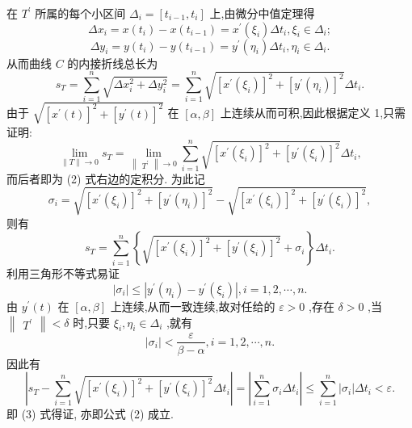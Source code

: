 在 \({T}^{\prime }\) 所属的每个小区间 \({\Delta }_{i} = \left\lbrack  {{t}_{i - 1},{t}_{i}}\right\rbrack\) 上,由微分中值定理得
\[
\Delta {x}_{i} = x\left( {t}_{i}\right)  - x\left( {t}_{i - 1}\right)  = {x}^{\prime }\left( {\xi }_{i}\right) \Delta {t}_{i},{\xi }_{i} \in  {\Delta }_{i};
\]
\[
\Delta {y}_{i} = y\left( {t}_{i}\right)  - y\left( {t}_{i - 1}\right)  = {y}^{\prime }\left( {\eta }_{i}\right) \Delta {t}_{i},{\eta }_{i} \in  {\Delta }_{i}.
\]
从而曲线 \(C\) 的内接折线总长为
\[
{s}_{T} = \mathop{\sum }\limits_{{i = 1}}^{n}\sqrt{\Delta {x}_{i}^{2} + \Delta {y}_{i}^{2}} = \mathop{\sum }\limits_{{i = 1}}^{n}\sqrt{{\left\lbrack  {x}^{\prime }\left( {\xi }_{i}\right) \right\rbrack  }^{2} + {\left\lbrack  {y}^{\prime }\left( {\eta }_{i}\right) \right\rbrack  }^{2}}\Delta {t}_{i}.
\]
由于 \(\sqrt{{\left\lbrack  {x}^{\prime }\left( t\right) \right\rbrack  }^{2} + {\left\lbrack  {y}^{\prime }\left( t\right) \right\rbrack  }^{2}}\) 在 \(\left\lbrack  {\alpha ,\beta }\right\rbrack\) 上连续从而可积,因此根据定义 1,只需证明:
\[
\mathop{\lim }\limits_{{\parallel T\parallel  \rightarrow  0}}{s}_{T} = \mathop{\lim }\limits_{{\begin{Vmatrix}{T}^{\prime }\end{Vmatrix} \rightarrow  0}}\mathop{\sum }\limits_{{i = 1}}^{n}\sqrt{{\left\lbrack  {x}^{\prime }\left( {\xi }_{i}\right) \right\rbrack  }^{2} + {\left\lbrack  {y}^{\prime }\left( {\xi }_{i}\right) \right\rbrack  }^{2}}\Delta {t}_{i}, \tag{3}
\]
而后者即为 (2) 式右边的定积分. 为此记
\[
{\sigma }_{i} = \sqrt{{\left\lbrack  {x}^{\prime }\left( {\xi }_{i}\right) \right\rbrack  }^{2} + {\left\lbrack  {y}^{\prime }\left( {\eta }_{i}\right) \right\rbrack  }^{2}} - \sqrt{{\left\lbrack  {x}^{\prime }\left( {\xi }_{i}\right) \right\rbrack  }^{2} + {\left\lbrack  {y}^{\prime }\left( {\xi }_{i}\right) \right\rbrack  }^{2}},
\]
则有
\[
{s}_{T} = \mathop{\sum }\limits_{{i = 1}}^{n}\left\{  {\sqrt{{\left\lbrack  {x}^{\prime }\left( {\xi }_{i}\right) \right\rbrack  }^{2} + {\left\lbrack  {y}^{\prime }\left( {\xi }_{i}\right) \right\rbrack  }^{2}} + {\sigma }_{i}}\right\}  \Delta {t}_{i}.
\]
利用三角形不等式易证
\[
\left| {\sigma }_{i}\right|  \leq  \left| {{y}^{\prime }\left( {\eta }_{i}\right)  - {y}^{\prime }\left( {\xi }_{i}\right) }\right| ,i = 1,2,\cdots ,n.
\]
由 \({y}^{\prime }\left( t\right)\) 在 \(\left\lbrack  {\alpha ,\beta }\right\rbrack\) 上连续,从而一致连续,故对任给的 \(\varepsilon  > 0\) ,存在 \(\delta  > 0\) ,当 \(\begin{Vmatrix}{T}^{\prime }\end{Vmatrix} < \delta\) 时,只要 \({\xi }_{i},{\eta }_{i} \in  {\Delta }_{i}\) ,就有
\[
\left| {\sigma }_{i}\right|  < \frac{\varepsilon }{\beta  - \alpha },i = 1,2,\cdots ,n.
\]
因此有
\[
\left| {{s}_{T} - \mathop{\sum }\limits_{{i = 1}}^{n}\sqrt{{\left\lbrack  {x}^{\prime }\left( {\xi }_{i}\right) \right\rbrack  }^{2} + {\left\lbrack  {y}^{\prime }\left( {\xi }_{i}\right) \right\rbrack  }^{2}}\Delta {t}_{i}}\right|  = \left| {\mathop{\sum }\limits_{{i = 1}}^{n}{\sigma }_{i}\Delta {t}_{i}}\right|  \leq  \mathop{\sum }\limits_{{i = 1}}^{n}\left| {\sigma }_{i}\right| \Delta {t}_{i} < \varepsilon .
\]
即 (3) 式得证, 亦即公式 (2) 成立.

